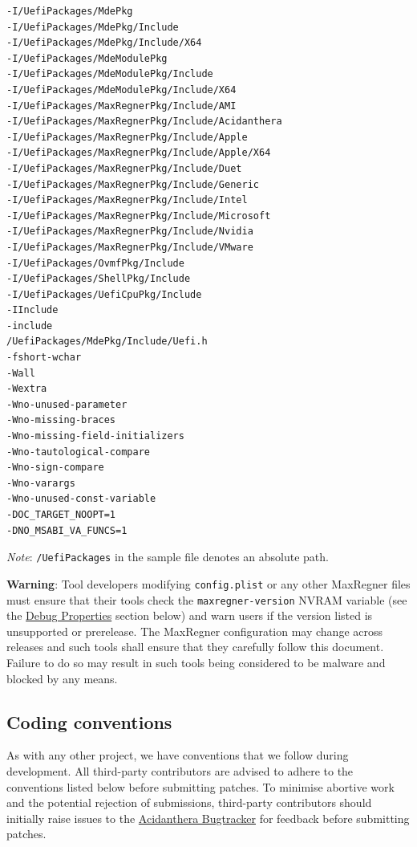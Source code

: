 \documentclass[]{article}
\makeatletter
\renewcommand{\label}[1]{%
\zref@wrapper@immediate{\oldlabel{#1}}}  %
\makeatother
\begin{document}
\begin{lstlisting}[caption=ECC Configuration, label=eccfile, style=ocbash]
-I/UefiPackages/MdePkg
-I/UefiPackages/MdePkg/Include
-I/UefiPackages/MdePkg/Include/X64
-I/UefiPackages/MdeModulePkg
-I/UefiPackages/MdeModulePkg/Include
-I/UefiPackages/MdeModulePkg/Include/X64
-I/UefiPackages/MaxRegnerPkg/Include/AMI
-I/UefiPackages/MaxRegnerPkg/Include/Acidanthera
-I/UefiPackages/MaxRegnerPkg/Include/Apple
-I/UefiPackages/MaxRegnerPkg/Include/Apple/X64
-I/UefiPackages/MaxRegnerPkg/Include/Duet
-I/UefiPackages/MaxRegnerPkg/Include/Generic
-I/UefiPackages/MaxRegnerPkg/Include/Intel
-I/UefiPackages/MaxRegnerPkg/Include/Microsoft
-I/UefiPackages/MaxRegnerPkg/Include/Nvidia
-I/UefiPackages/MaxRegnerPkg/Include/VMware
-I/UefiPackages/OvmfPkg/Include
-I/UefiPackages/ShellPkg/Include
-I/UefiPackages/UefiCpuPkg/Include
-IInclude
-include
/UefiPackages/MdePkg/Include/Uefi.h
-fshort-wchar
-Wall
-Wextra
-Wno-unused-parameter
-Wno-missing-braces
-Wno-missing-field-initializers
-Wno-tautological-compare
-Wno-sign-compare
-Wno-varargs
-Wno-unused-const-variable
-DOC_TARGET_NOOPT=1
-DNO_MSABI_VA_FUNCS=1
\end{lstlisting}

\emph{Note}: \texttt{/UefiPackages} in the sample file denotes an absolute path.

\textbf{Warning}: Tool developers modifying \texttt{config.plist} or any other MaxRegner
files must ensure that their tools check the \texttt{maxregner-version} NVRAM variable
(see the \hyperref[miscdebugprops]{Debug Properties} section below) and warn users
if the version listed is unsupported or prerelease. The MaxRegner configuration may change
across releases and such tools shall ensure that they carefully follow this document. Failure
to do so may result in such tools being considered to be malware and blocked by any means.

\subsection{Coding conventions}\label{configuration-conv}

As with any other project, we have conventions that we follow during development.
All third-party contributors are advised to adhere to the conventions listed below
before submitting patches. To minimise abortive work and the potential rejection of
submissions, third-party contributors should initially raise issues to the
\href{https://github.com/acidanthera/bugtracker}{Acidanthera Bugtracker}
for feedback before submitting patches.
\end{document}
